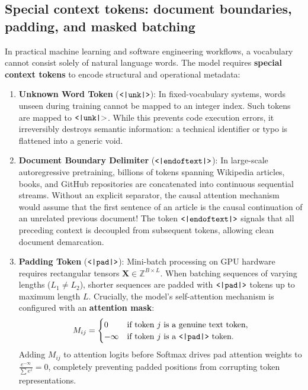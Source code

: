 \documentclass[../../main.tex]{subfiles}
\begin{document}
\subsection{Special context tokens: document boundaries, padding, and masked batching}
\label{subsec:special_tokens}

In practical machine learning and software engineering workflows, a vocabulary cannot consist solely of natural language words. The model requires \textbf{special context tokens} to encode structural and operational metadata:

\begin{enumerate}
    \item \textbf{Unknown Word Token} ($\text{\texttt{<|unk|>}}$):
    In fixed-vocabulary systems, words unseen during training cannot be mapped to an integer index. Such tokens are mapped to $\text{\texttt{<|unk|}>}$. While this prevents code execution errors, it irreversibly destroys semantic information: a technical identifier or typo is flattened into a generic void.
    
    \item \textbf{Document Boundary Delimiter} ($\text{\texttt{<|endoftext|>}}$):
    In large-scale autoregressive pretraining, billions of tokens spanning Wikipedia articles, books, and GitHub repositories are concatenated into continuous sequential streams. Without an explicit separator, the causal attention mechanism would assume that the first sentence of an article is the causal continuation of an unrelated previous document!
    The token $\text{\texttt{<|endoftext|>}}$ signals that all preceding context is decoupled from subsequent tokens, allowing clean document demarcation.
    
    \item \textbf{Padding Token} ($\text{\texttt{<|pad|>}}$):
    Mini-batch processing on GPU hardware requires rectangular tensors $\mathbf{X} \in \mathbb{Z}^{B \times L}$. When batching sequences of varying lengths ($L_1 \ne L_2$), shorter sequences are padded with $\text{\texttt{<|pad|>}}$ tokens up to maximum length $L$. Crucially, the model's self-attention mechanism is configured with an \textbf{attention mask}:
    \begin{equation}
    \label{eq:pad_attention_mask}
    M_{ij} = \begin{cases} 0 & \text{if token } j \text{ is a genuine text token}, \\ -\infty & \text{if token } j \text{ is a } \text{\texttt{<|pad|>}} \text{ token}. \end{cases}
    \end{equation}
    Adding $M_{ij}$ to attention logits before Softmax drives pad attention weights to $\frac{e^{-\infty}}{\sum e^z} = 0$, completely preventing padded positions from corrupting token representations.
\end{enumerate}
\end{document}
